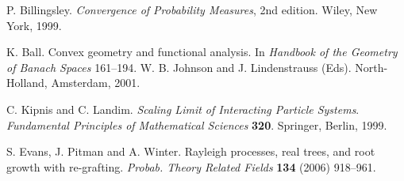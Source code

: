 \documentclass[aihp]{imsart}
\theoremstyle{plain}
\theoremstyle{remark}
\begin{document}


\begin{thebibliography}{4}

P. Billingsley. \textit{Convergence of
Probability Measures}, 2nd edition. Wiley, New York, 1999.

K. Ball. Convex geometry and functional analysis. In \textit{Handbook of the Geometry of Banach Spaces} 161--194.
W. B. Johnson and J. Lindenstrauss (Eds).  North-Holland, Amsterdam, 2001.

C. Kipnis and C. Landim. \textit{Scaling Limit of Interacting Particle Systems}. \textit{Fundamental Principles of Mathematical Sciences} \textbf{320}.
Springer, Berlin, 1999.

S. Evans, J. Pitman and A. Winter.
Rayleigh processes, real trees, and root growth with re-grafting. \textit{Probab. Theory Related Fields}
\textbf{134} (2006) 918--961.

\end{thebibliography}
\end{document}
